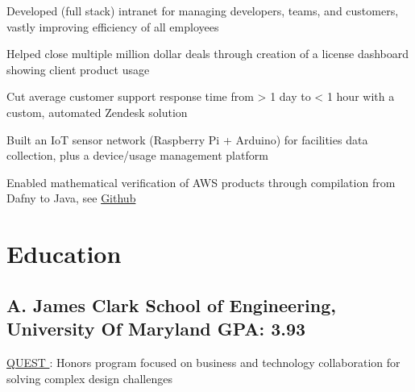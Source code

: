 \documentclass[print]{jack-resume}
\begin{document}
\begin{tightemize}
    \item Developed (full stack) intranet for managing developers, teams, and customers, vastly improving efficiency of all employees
    \item Helped close multiple million dollar deals through creation of a license dashboard showing client product usage
    \item Cut average customer support response time from > 1 day to < 1 hour with a custom, automated Zendesk solution
\end{tightemize}
\sectionsep

\begin{tightemize}
    \item Built an IoT sensor network (Raspberry Pi + Arduino) for facilities data collection, plus a device/usage management platform
\end{tightemize}

\begin{tightemize}
    \item Enabled mathematical verification of AWS products through compilation from Dafny to Java, see \href{https://github.com/dafny-lang/dafny}{Github \ExternalLink}
\end{tightemize}
\sectionsep

\section{Education}
\subsection{A. James Clark School of Engineering, University Of Maryland \hfill GPA: 3.93}
 \hfill
\begin{tightemize}
    \item \color{darkmodePrimary}\href{https://www.rhsmith.umd.edu/programs/undergraduate-programs/academics/fellows-special-programs/quest}{QUEST \ExternalLink}: Honors program focused on business and technology collaboration for solving complex design challenges
\end{tightemize}

\begin{minipage}[t]{0.04\textwidth}
    \hfill
\end{minipage}
\end{document}
